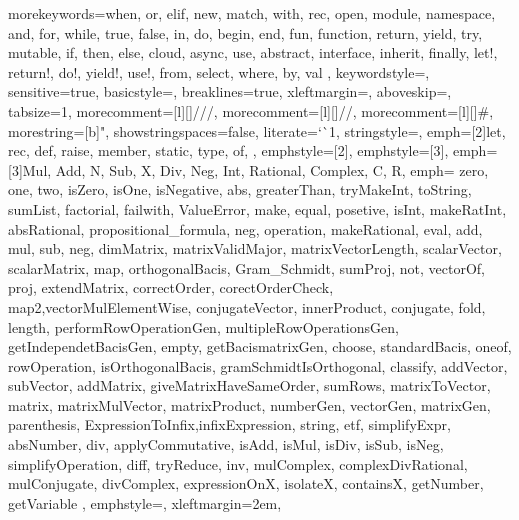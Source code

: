 




%
{
  morekeywords={when, or, elif, new, match, with, rec, open, module, namespace, %
    and, for, while, true, false, in, do, begin, end, fun, function, return, yield, try, %
    mutable, if, then, else, cloud, async, use, abstract, interface, inherit, finally,
    let!, return!, do!, yield!, use!, from, select, where, by, val },
  keywordstyle=\color{codepurple},
  sensitive=true,
  basicstyle=\ttfamily\footnotesize,
  breaklines=true,
  xleftmargin=\parindent,
  aboveskip=\bigskipamount,
  tabsize=1,
  morecomment=[l][\color{greencomments}]{///},
  morecomment=[l][\color{greencomments}]{//},
  morecomment=[l][\color{greencomments}]{\#},
  morestring=[b]",
  showstringspaces=false,
  literate={`}{\`}1,
  stringstyle=\color{greencomments},
  emph={[2]let, rec, def, raise, member, static, type, of, }, %
  emphstyle={[2]\color{bluekeywords}},
  emphstyle={[3]\color{liteblue}},
  emph={[3]Mul, Add, N, Sub, X, Div, Neg, Int, Rational, Complex, C, R},
  emph={
    zero, one, two, isZero, isOne, isNegative, abs, greaterThan, tryMakeInt, toString, sumList, factorial, failwith, ValueError, make, equal, posetive, isInt, makeRatInt, absRational, propositional_formula, neg, operation, makeRational, eval, add, mul, sub, neg, dimMatrix, matrixValidMajor, matrixVectorLength, scalarVector, scalarMatrix, map, orthogonalBacis, Gram_Schmidt, sumProj, not, vectorOf, proj, extendMatrix, correctOrder, corectOrderCheck, map2,vectorMulElementWise, conjugateVector, innerProduct, conjugate, fold, length, performRowOperationGen, multipleRowOperationsGen, getIndependetBacisGen, empty, getBacismatrixGen, choose, standardBacis, oneof, rowOperation, isOrthogonalBacis, gramSchmidtIsOrthogonal, classify, addVector, subVector, addMatrix, giveMatrixHaveSameOrder, sumRows, matrixToVector, matrix, matrixMulVector, matrixProduct, numberGen, vectorGen, matrixGen, parenthesis, ExpressionToInfix,infixExpression, string, etf, simplifyExpr, absNumber, div, applyCommutative, isAdd, isMul, isDiv, isSub, isNeg, simplifyOperation, diff, tryReduce, inv, mulComplex, complexDivRational, mulConjugate, divComplex, expressionOnX, isolateX, containsX, getNumber, getVariable
    }, %
  emphstyle=\color{red},
  xleftmargin=2em,
}




